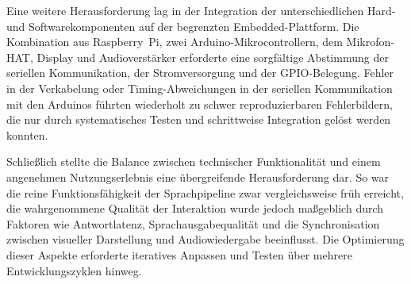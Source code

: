 Eine weitere Herausforderung lag in der Integration der unterschiedlichen Hard- und Softwarekomponenten auf der begrenzten Embedded-Plattform.
Die Kombination aus Raspberry~Pi, zwei Arduino-Mikrocontrollern, dem Mikrofon-HAT, Display und Audioverstärker erforderte eine sorgfältige Abstimmung der seriellen Kommunikation, der Stromversorgung und der GPIO-Belegung.
Fehler in der Verkabelung oder Timing-Abweichungen in der seriellen Kommunikation mit den Arduinos führten wiederholt zu schwer reproduzierbaren Fehlerbildern, die nur durch systematisches Testen und schrittweise Integration gelöst werden konnten.

Schließlich stellte die Balance zwischen technischer Funktionalität und einem angenehmen Nutzungserlebnis eine übergreifende Herausforderung dar.
So war die reine Funktionsfähigkeit der Sprachpipeline zwar vergleichsweise früh erreicht, die wahrgenommene Qualität der Interaktion wurde jedoch maßgeblich durch Faktoren wie Antwortlatenz, Sprachausgabequalität und die Synchronisation zwischen visueller Darstellung und Audiowiedergabe beeinflusst.
Die Optimierung dieser Aspekte erforderte iteratives Anpassen und Testen über mehrere Entwicklungszyklen hinweg.